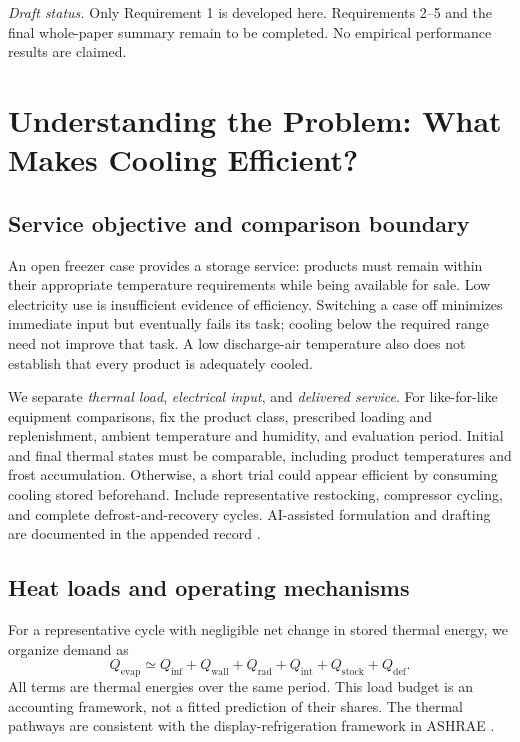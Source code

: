 \documentclass[12pt]{article}
\begin{document}
\medskip
\noindent\textit{Draft status.} Only Requirement 1 is developed here. Requirements 2--5 and the final whole-paper summary remain to be completed. No empirical performance results are claimed.

\clearpage
\pagestyle{fancy}
\tableofcontents
\clearpage

\section{Understanding the Problem: What Makes Cooling Efficient?}
\label{sec:understand}
\subsection{Service objective and comparison boundary}

An open freezer case provides a storage service: products must remain within their appropriate temperature requirements while being available for sale. Low electricity use is insufficient evidence of efficiency. Switching a case off minimizes immediate input but eventually fails its task; cooling below the required range need not improve that task. A low discharge-air temperature also does not establish that every product is adequately cooled.

We separate \emph{thermal load}, \emph{electrical input}, and \emph{delivered service}. For like-for-like equipment comparisons, fix the product class, prescribed loading and replenishment, ambient temperature and humidity, and evaluation period. Initial and final thermal states must be comparable, including product temperatures and frost accumulation. Otherwise, a short trial could appear efficient by consuming cooling stored beforehand. Include representative restocking, compressor cycling, and complete defrost-and-recovery cycles. AI-assisted formulation and drafting are documented in the appended record \cite{codex}.

\subsection{Heat loads and operating mechanisms}

For a representative cycle with negligible net change in stored thermal energy, we organize demand as
\begin{equation}
Q_{\mathrm{evap}}\simeq
Q_{\mathrm{inf}}+Q_{\mathrm{wall}}+Q_{\mathrm{rad}}
+Q_{\mathrm{int}}+Q_{\mathrm{stock}}+Q_{\mathrm{def}}.
\label{eq:budget}
\end{equation}
All terms are thermal energies over the same period. This load budget is an accounting framework, not a fitted prediction of their shares. The thermal pathways are consistent with the display-refrigeration framework in ASHRAE \cite{ashrae}.
\end{document}
